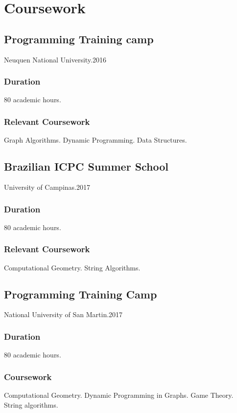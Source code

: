 \section{Coursew\textcolor{mycolor}{ork}}
  \subsection{Programming Training camp}
    Neuquen National University.{\textcolor{mygrey}{\hspace*{\fill}2016}}
    \subsubsection{Duration}
      80 academic hours.
    \subsubsection{Relevant Coursework}
      Graph Algorithms. Dynamic Programming. Data Structures.
  \subsection{Brazilian ICPC Summer School}
    University of Campinas.{\textcolor{mygrey}{\hspace*{\fill}2017}}
    \subsubsection{Duration}
      80 academic hours.
    \subsubsection{Relevant Coursework}
      Computational Geometry. String Algorithms.
  \subsection{Programming Training Camp}
    National University of San Martin.{\textcolor{mygrey}{\hspace*{\fill}2017}}
    \subsubsection{Duration}
      80 academic hours.
    \subsubsection{Coursework}
      Computational Geometry. Dynamic Programming in Graphs. Game Theory. String algorithms.
